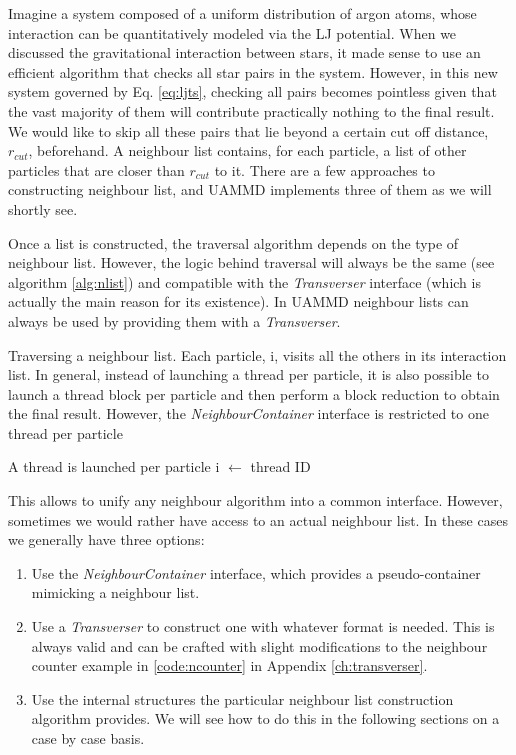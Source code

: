 \documentclass[ twoside,openright,titlepage,numbers=noenddot,%
headinclude,footinclude,cleardoublepage=empty,abstract=on,
BCOR=5mm,paper=b5,fontsize=11pt, dvipsnames
]{scrreprt}
\newcommand{\uammd}{\gls{UAMMD}\xspace}
\begin{document}
Imagine a system composed of a uniform distribution of argon atoms, whose interaction can be quantitatively modeled via the \gls{LJ} potential. When we discussed the gravitational interaction between stars, it made sense to use an efficient algorithm that checks all star pairs in the system. However, in this new system governed by Eq. \eqref{eq:ljts}, checking all pairs becomes pointless given that the vast majority of them will contribute practically nothing to the final result. We would like to skip all these pairs that lie beyond a certain cut off distance, $r_{cut}$, beforehand. A neighbour list contains, for each particle, a list of other particles that are closer than $r_{cut}$ to it. There are a few approaches to constructing neighbour list, and \uammd implements three of them as we will shortly see.

Once a list is constructed, the traversal algorithm depends on the type of neighbour list. However, the logic behind traversal will always be the same (see algorithm \ref{alg:nlist}) and compatible with the \emph{Transverser} interface (which is actually the main reason for its existence). In \uammd neighbour lists can always be used by providing them with a \emph{Transverser}.

\begin{algorithm}
  \caption{Traversing a neighbour list. Each particle, i, visits all the others in its interaction list.
    In general, instead of launching a thread per particle, it is also possible to launch a thread block per particle and then perform a block reduction to obtain the final result. However, the \emph{NeighbourContainer} interface is restricted to one thread per particle}\label{alg:nlist}
  \begin{algorithmic}[1]
    \Require A thread is launched per particle
    \State i $\gets$ thread ID 
    \EndFor
  \end{algorithmic}
\end{algorithm}

This allows to unify any neighbour algorithm into a common interface. However, sometimes we would rather have access to an actual neighbour list. In these cases we generally have three options:
\begin{enumerate}
\item Use the \emph{NeighbourContainer} interface, which provides a pseudo-container mimicking a neighbour list.
\item Use a \emph{Transverser} to construct one with whatever format is needed.
  This is always valid and can be crafted with slight modifications to the neighbour counter example in \ref{code:ncounter} in Appendix \ref{ch:transverser}.
\item Use the internal structures the particular neighbour list construction algorithm provides.
  We will see how to do this in the following sections on a case by case basis.
\end{enumerate}
\end{document}
